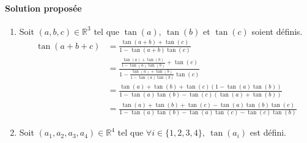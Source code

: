\documentclass[10pt]{article}
\def\R{\mathbb R}
\def\lb{\lbrace}
\def\rb{\rbrace}
\begin{document}
    \paragraph{Solution proposée} 
    \begin{enumerate}
        \item Soit $(a,b,c)\in\R^3$ tel que $\tan(a),\ \tan(b)$ et $\tan(c)$ soient définis.\\

        \begin{align*}
            \tan(a+b+c) &=\frac{\tan(a+b)+\tan(c)}{1-\tan(a+b)\tan(c)}\\
                        &=\frac{\frac{\tan(a)+\tan(b)}{1-\tan(a)\tan(b)}+\tan(c)}{1-\frac{\tan(a)+\tan(b)}{1-\tan(a)\tan(b)}\tan(c)}\\
                        &=\frac{\tan(a)+\tan(b)+\tan(c)(1-\tan(a)\tan(b))}{1-\tan(a)\tan(b)-\tan(c)(\tan(a)+\tan(b))}\\
                        &=\frac{\tan(a)+\tan(b)+\tan(c)-\tan(a)\tan(b)\tan(c)}{1-\tan(a)\tan(b)-\tan(a)\tan(c)-\tan(c)\tan(b)}
        \end{align*}

        \item Soit $(a_1,a_2,a_3,a_4)\in\R^4$ tel que $\forall i\in\lb1,2,3,4\rb,\ \tan(a_i)$ est défini.\\


\end{enumerate}
\end{document}
